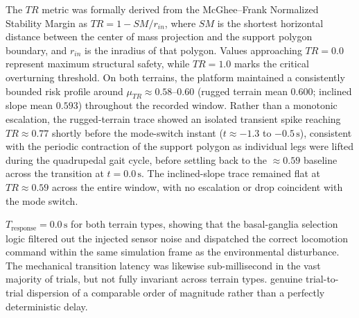  The $TR$ metric was formally derived from the McGhee--Frank Normalized Stability Margin as $TR = 1 - SM/r_{in}$, where $SM$ is the shortest horizontal distance between the center of mass projection and the support polygon boundary, and $r_{in}$ is the inradius of that polygon. Values approaching $TR = 0.0$ represent maximum structural safety, while $TR = 1.0$ marks the critical overturning threshold. On both terrains, the platform maintained a consistently bounded risk profile around $\mu_{TR} \approx 0.58$--$0.60$ (rugged terrain mean $0.600$; inclined slope mean $0.593$) throughout the recorded window. Rather than a monotonic escalation, the rugged-terrain trace showed an isolated transient spike reaching $TR \approx 0.77$ shortly before the mode-switch instant ($t \approx -1.3$ to $-0.5\,\text{s}$), consistent with the periodic contraction of the support polygon as individual legs were lifted during the quadrupedal gait cycle, before settling back to the $\approx 0.59$ baseline across the transition at $t = 0.0\,\text{s}$. The inclined-slope trace remained flat at $TR \approx 0.59$ across the entire window, with no escalation or drop coincident with the mode switch.


   $T_{\text{response}} = 0.0\,\text{s}$ for both terrain types, showing that the basal-ganglia selection logic filtered out the injected sensor noise and dispatched the correct locomotion command within the same simulation frame as the environmental disturbance. The mechanical transition latency was likewise sub-millisecond in the vast majority of trials, but not fully invariant across terrain types.  genuine trial-to-trial dispersion of a comparable order of magnitude rather than a perfectly deterministic delay. 

